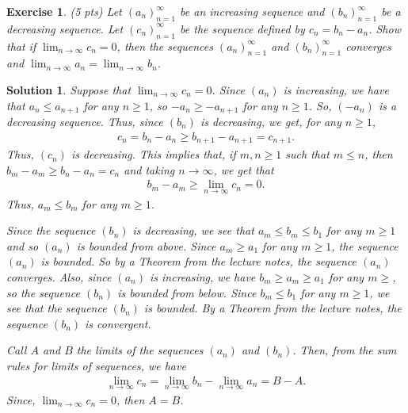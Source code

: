 \documentclass[12pt]{article}
\newcommand{\ra}{\rightarrow}
\theoremstyle{plain}
\newtheorem{exer}{\textbf{Exercise}}}
\theoremstyle{plain}
\newtheorem*{sol}{\textbf{Solution}}}
\theoremstyle{plain}
\theoremstyle{plain}
\begin{document}

\begin{exer}
(5 pts)
Let $(a_n)_{n = 1}^\infty$ be an increasing sequence and $(b_n)_{n = 1}^\infty$ be a decreasing sequence. Let $(c_n)_{n = 1}^\infty$ be the sequence defined by $c_n = b_n - a_n$. Show that if $\lim_{n \ra \infty} c_n = 0$, then the sequences $(a_n)_{n = 1}^\infty$ and $(b_n)_{n = 1}^\infty$ converges and $\lim_{n \ra \infty} a_n = \lim_{n \ra \infty} b_n$.
\end{exer}
\begin{sol}
Suppose that $\lim_{n\ra \infty} c_n = 0$. Since $(a_n)$ is increasing, we have that $a_n \leq a_{n + 1}$ for any $n \geq 1$, so $-a_n \geq -a_{n + 1}$ for any $n \geq 1$. So, $(-a_n)$ is a decreasing sequence. Thus, since $(b_n)$ is decreasing, we get, for any $n \geq 1$,
	\begin{align*}
	c_n = b_n - a_n \geq b_{n + 1} - a_{n + 1} = c_{n + 1} .
	\end{align*}
Thus, $(c_n)$ is decreasing. This implies that, if $m, n \geq 1$ such that $m \leq n$, then $b_m - a_m \geq b_n - a_n = c_n$ and taking $n \ra \infty$, we get that
	\begin{align*}
	b_m - a_m \geq \lim_{n \ra \infty} c_n = 0 .
	\end{align*}
Thus, $a_m \leq b_m$ for any $m \geq 1$.

Since the sequence $(b_n)$ is decreasing, we see that $a_m \leq b_m \leq b_1$ for any $m \geq 1$ and so $(a_n)$ is bounded from above. Since $a_m \geq a_1$ for any $m \geq 1$, the sequence $(a_n)$ is bounded. So by a Theorem from the lecture notes, the sequence $(a_n)$ converges. Also, since $(a_n)$ is increasing, we have $b_m \geq a_m \geq a_1$ for any $m \geq$, so the sequence $(b_n)$ is bounded from below. Since $b_m \leq b_1$ for any $m \geq 1$, we see that the sequence $(b_n)$ is bounded. By a Theorem from the lecture notes, the sequence $(b_n)$ is convergent.

Call $A$ and $B$ the limits of the sequences $(a_n)$ and $(b_n)$. Then, from the sum rules for limits of sequences, we have
	\begin{align*}
	\lim_{n \ra \infty} c_n = \lim_{n \ra \infty} b_n - \lim_{n \ra \infty} a_n = B - A .
	\end{align*}
Since, $\lim_{n \ra \infty} c_n = 0$, then $A = B$.
\end{sol}
\end{document}
